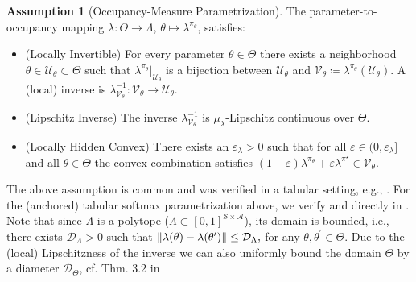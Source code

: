 \documentclass{article}
\theoremstyle{plain}
\theoremstyle{definition}
\newtheorem{assumption}[theorem]{Assumption}
\theoremstyle{remark}
\def\SS{{\mathcal{S}}}
\def\AA{{\mathcal{A}}}
\def\VV{{\mathcal{V}}}
\def\epsilon{{\varepsilon}}
\DeclarePairedDelimiter{\norm}{\lVert}{\rVert}
\newcommand{\define}{\coloneqq}
\def\epsLam{\epsilon_\lambda}
\def\piOpt{\pi^{\star}}
\def\XX{{\Theta}}
\def\DDX{{\mathcal{D}_\XX}}
\def\DDLam{{\mathcal{D}_\Lambda}}
\def\lamLip{{\mu_\lambda}}
\begin{document}
\begin{assumption}[Occupancy-Measure Parametrization]\label{ass:ParametrizationSOAM}
 The parameter-to-occupancy mapping
 $\lambda:\Theta\to\Lambda$, $\theta\mapsto\lambda^{\pi_\theta}$,
 satisfies:
 \begin{itemize}
  \item (Locally Invertible) For every parameter $\theta \in \Theta$
        there exists a neighborhood
        $\theta \in \mathcal{U}_\theta \subset \Theta$ such
        that $\lambda^{\pi_\theta}\vert_{\mathcal{U}_\theta}$ is a bijection
        between $\mathcal{U}_\theta$ and
        $\VV_\theta \define \lambda^{\pi_\theta}(\mathcal{U}_\theta)$. A (local) inverse is  $\lambda^{-1}_{\VV_\theta}
         : \VV_\theta \to \mathcal{U}_\theta$.
  \item %
        (Lipschitz Inverse) The inverse $\lambda^{-1}_{\VV_\theta}$ is $\lamLip$-Lipschitz continuous over $\Theta.$
  \item (Locally Hidden Convex) There exists an $\epsLam > 0$ such that
        for all $\epsilon \in (0, \epsLam]$ and all $\theta \in \Theta$
        the convex combination satisfies
        $(1-\epsilon) \lambda^{\pi_\theta} + \epsilon \lambda^{\piOpt}
         \in \VV_\theta$.
 \end{itemize}
\end{assumption}
The above assumption is common and was verified in a tabular setting, e.g.,
\citep[Prop. H.1]{zhangVariationalPolicyGradient2020}.
For the (anchored) tabular softmax parametrization above, we verify
 and  directly in
.
Note that since $\Lambda$ is a polytope ($\Lambda \subset [0,1]^{\SS
  \times \AA}$), its domain is bounded, i.e., there exists $\DDLam > 0$ such that
$\norm{\lambda(\theta) - \lambda(\theta^\prime)}
 \leq \DDLam,
$ %
for any $\theta, \theta^\prime \in \Theta$. Due to the (local)
Lipschitzness of the inverse we can also uniformly bound the domain
$\Theta$ by a diameter $\DDX$, cf. Thm. 3.2 in
\citet{zhangVariationalPolicyGradient2020}
\end{document}
